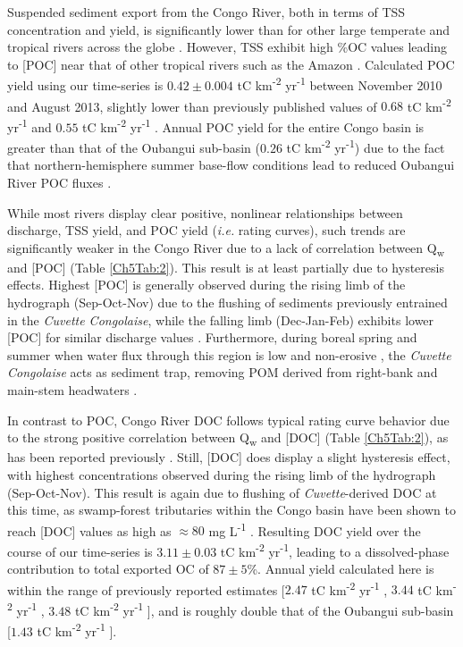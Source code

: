 Suspended sediment export from the Congo River, both in terms of TSS concentration and yield, is significantly lower than for other large temperate and tropical rivers across the globe \citep{Ludwig:1998ud,Milliman:2011ug,Galy:2015fx}. However, TSS exhibit high \%OC values leading to [POC] near that of other tropical rivers such as the Amazon \citep{Richey:1990wl}. Calculated POC yield using our time-series is $0.42 \pm 0.004$ tC km\textsuperscript{-2} yr\textsuperscript{-1} between November 2010 and August 2013, slightly lower than previously published values of $0.68$ tC km\textsuperscript{-2} yr\textsuperscript{-1} \citep{Ludwig:1996ul} and $0.55$ tC km\textsuperscript{-2} yr\textsuperscript{-1} \citep{Coynel:2005cn,Spencer:2016ho}. Annual POC yield for the entire Congo basin is greater than that of the Oubangui sub-basin ($0.26$ tC km\textsuperscript{-2} yr\textsuperscript{-1}) due to the fact that northern-hemisphere summer base-flow conditions lead to reduced Oubangui River POC fluxes \citep{Bouillon:2012cw}.

While most rivers display clear positive, nonlinear relationships between discharge, TSS yield, and POC yield (\textit{i.e.} rating curves), such trends are significantly weaker in the Congo River due to a lack of correlation between Q\textsubscript{w} and [POC] (Table \ref{Ch5Tab:2}). This result is at least partially due to hysteresis effects. Highest [POC] is generally observed during the rising limb of the hydrograph (Sep-Oct-Nov) due to the flushing of sediments previously entrained in the \textit{Cuvette Congolaise}, while the falling limb (Dec-Jan-Feb) exhibits lower [POC] for similar discharge values \citep{Spencer:2016ho}. Furthermore, during boreal spring and summer when water flux through this region is low and non-erosive \citep{Bricquet:1993ve,Henchiri:2016jh}, the \textit{Cuvette Congolaise} acts as sediment trap, removing POM derived from right-bank and main-stem headwaters \citep{Laraque:2009fz}.

In contrast to POC, Congo River DOC follows typical rating curve behavior due to the strong positive correlation between Q\textsubscript{w} and [DOC] (Table \ref{Ch5Tab:2}), as has been reported previously \citep{Coynel:2005cn,Wang:2013js,Spencer:2016ho}. Still, [DOC] does display a slight hysteresis effect, with highest concentrations observed during the rising limb of the hydrograph (Sep-Oct-Nov). This result is again due to flushing of \textit{Cuvette}-derived DOC at this time, as swamp-forest tributaries within the Congo basin have been shown to reach [DOC] values as high as $\approx 80$ mg L\textsuperscript{-1} \citep{Mann:2014jx}. Resulting DOC yield over the course of our time-series is $3.11 \pm 0.03$ tC km\textsuperscript{-2} yr\textsuperscript{-1}, leading to a dissolved-phase contribution to total exported OC of $87 \pm 5$\%. Annual yield calculated here is within the range of previously reported estimates [$2.47$ tC km\textsuperscript{-2} yr\textsuperscript{-1} \citep{Ludwig:1996ul}, $3.44$ tC km\textsuperscript{-2} yr\textsuperscript{-1} \citep{Coynel:2005cn}, $3.48$ tC km\textsuperscript{-2} yr\textsuperscript{-1} \citep{Spencer:2016ho}], and is roughly double that of the Oubangui sub-basin [$1.43$ tC km\textsuperscript{-2} yr\textsuperscript{-1} \citep{Bouillon:2012cw}].

